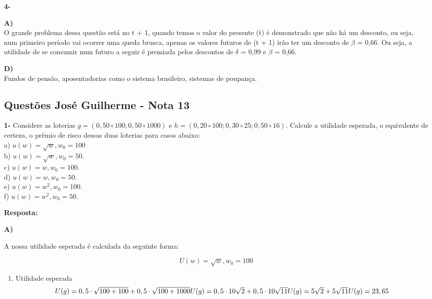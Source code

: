 \begin{flushleft}
\singlespacing

\textbf{4-}
\singlespacing

\textbf{A)} 
\\
O grande problema dessa questão está no t + 1, quando temos o valor do presente (t) é demonstrado que não há um desconto, ou seja, num primeiro período vai ocorrer uma queda brusca, apenas os valores futuros de (t + 1) irão ter um desconto de $\beta$ = 0,66. Ou seja, a utilidade de se consumir num futuro a seguir é premiada pelos descontos de  $\delta$ = 0,99 e $\beta$ = 0,66.

\singlespacing

\textbf{D)} 
\\
Fundos de pensão, aposentadorias como o sistema brasileiro, sistemas de poupança. 

\singlespacing

\begin{center}
\section*{Questões José Guilherme - Nota 13}
\end{center}

\textbf{1-} Considere as loterias $g=(0,50 \circ 100 ; 0,50 \circ 1000)$ e $h=(0,20 \circ 100 ; 0,30 \circ 25 ; 0,50 \circ 16)$. Calcule a utilidade esperada, o equivalente de certeza, o prêmio de risco dessas duas loterias para casos abaixo:
\\
a) $u(w)=\sqrt{w}, w_{0}=100$
\\
b) $u(w)=\sqrt{w}, w_{0}=50$.
\\
c) $u(w)=w, w_{0}=100$.
\\
d) $u(w)=w, w_{0}=50$.
\\
e) $u(w)=w^{2}, w_{0}=100$.
\\
f) $u(w)=w^{2}, w_{0}=50$.

\singlespacing

\textbf{Resposta:}

\textbf{A)}

A nossa utilidade esperada é calculada da seguinte forma:

\begin{equation}
	U(w) = \sqrt{w} ,   w_{0} = 100
\end{equation}

\begin{enumerate}
	\item Utilidade esperada
	\begin{equation}
		U(g) = 0,5 \cdot \sqrt{100 + 100} + 0,5 \cdot \sqrt{100 + 1000}
		$$\\$$
		U(g) = 0,5 \cdot 10\sqrt{2}  + 0,5 \cdot 10 \sqrt{11}
		$$\\$$
		U(g) = 5 \sqrt{2} + 5\sqrt{11}
		$$\\$$
		U(g) = 23,65
	\end{equation}
	

\end{enumerate}
\end{flushleft}
